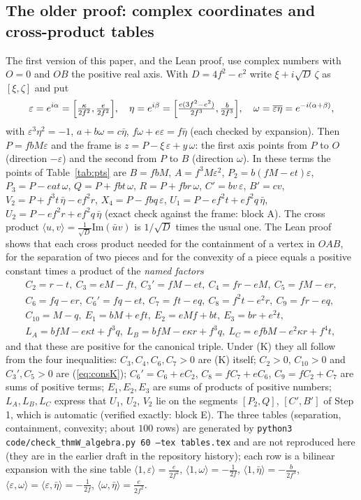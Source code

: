 \documentclass[11pt,reqno]{amsart}
\theoremstyle{plain}
\theoremstyle{definition}
\begin{document}
\subsection{The older proof: complex coordinates and cross-product tables}\label{app:complex}
The first version of this paper, and the Lean proof, use complex numbers with $O=0$ and $OB$ the positive real axis. With $D=4f^2-e^2$ write $\xi+i\sqrt D\,\zeta$ as $[\xi,\zeta]$ and put
\[
\varepsilon=e^{i\alpha}=\Bigl[\tfrac{\kappa}{2f^2},\tfrac{e}{2f^2}\Bigr],\quad
\eta=e^{i\beta}=\Bigl[\tfrac{e(3f^2-e^2)}{2f^3},\tfrac{b}{2f^3}\Bigr],\quad \omega=\overline{\varepsilon\eta}=e^{-i(\alpha+\beta)},
\]
with $\varepsilon^3\eta^2=-1$, $a+b\omega=c\bar\eta$, $f\omega+e\varepsilon=f\bar\eta$ (each checked by expansion). Then $P=fbM\varepsilon$ and the frame is $z=P-\xi\,\varepsilon+y\,\omega$: the first axis points from $P$ to $O$ (direction $-\varepsilon$) and the second from $P$ to $B$ (direction $\omega$). In these terms the points of Table~\ref{tab:pts} are $B=fbM$, $A=f^3M\varepsilon^2$, $P_2=b(fM-et)\varepsilon$, $P_3=P-eat\,\omega$, $Q=P+fbt\,\omega$, $R=P+fbr\,\omega$, $C'=bv\,\varepsilon$, $B'=cv$, $V_2=P+f^3t\,\bar\eta-ef^2r$, $X_4=P-fbq\,\varepsilon$, $U_1=P-ef^2t+ef^2q\,\bar\eta$, $U_2=P-ef^2r+ef^2q\,\bar\eta$ (exact check against the frame: block A).
The cross product $\langle u,v\rangle=\frac1{\sqrt D}\mathrm{Im}(\bar uv)$ is $1/\sqrt D$ times the usual one. The Lean proof shows that each cross product needed for the containment of a vertex in $OAB$, for the separation of two pieces and for the convexity of a piece equals a positive constant times a product of the \emph{named factors}
\begin{gather*}
C_2=r-t,\ C_3=eM-ft,\ C_3'=fM-et,\ C_4=fr-eM,\ C_5=fM-er,\\
C_6=fq-er,\ C_6'=fq-et,\ C_7=ft-eq,\ C_8=f^2t-e^2r,\ C_9=fr-eq,\\
C_{10}=M-q,\ E_1=bM+eft,\ E_2=eMf+bt,\ E_3=br+e^2t,\\
L_A=bfM-e\kappa t+f^3q,\ L_B=bfM-e\kappa r+f^3q,\ L_C=efbM-e^2\kappa r+f^4t,
\end{gather*}
and that these are positive for the canonical triple. Under (K) they all follow from the four inequalities: $C_3,C_4,C_6,C_7>0$ are (K) itself; $C_2>0$, $C_{10}>0$ and $C_3',C_5>0$ are (\ref{eq:consK}); $C_6'=C_6+eC_2$, $C_8=fC_7+eC_6$, $C_9=fC_2+C_7$ are sums of positive terms; $E_1,E_2,E_3$ are sums of products of positive numbers; $L_A,L_B,L_C$ express that $U_1$, $U_2$, $V_2$ lie on the segments $[P_2,Q]$, $[C',B']$ of Step 1, which is automatic (verified exactly: block E). The three tables (separation, containment, convexity; about $100$ rows) are generated by \texttt{python3 code/check\_thmW\_algebra.py 60 --tex tables.tex} and are not reproduced here (they are in the earlier draft in the repository history); each row is a bilinear expansion with the sine table $\langle1,\varepsilon\rangle=\frac e{2f^2}$, $\langle1,\omega\rangle=-\frac1{2f}$, $\langle1,\bar\eta\rangle=-\frac b{2f^3}$, $\langle\varepsilon,\omega\rangle=\langle\varepsilon,\bar\eta\rangle=-\frac1{2f}$, $\langle\omega,\bar\eta\rangle=\frac e{2f^2}$.
\end{document}
